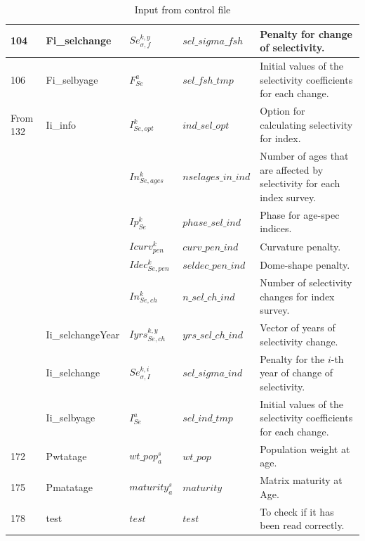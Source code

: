 \documentclass{article}
\begin{document}
\begin{table}[H]
\begin{tabular}{|| p{0.9cm} | p{4.0cm}  | p{1.9cm} | l | p{6cm} ||}
104 & Fi\_selchange &  $Se_{\sigma,f}^{k,y}$ & $sel\_sigma\_fsh$ & Penalty for change of selectivity.\\ \hline
106 & Fi\_selbyage & $F_{Se}^a$  & $sel\_fsh\_tmp$ &  Initial values of the selectivity coefficients for each change.\\ \hline
From 132 & Ii\_info   & $I_{Se,opt}^k$  & $ind\_sel\_opt$ & Option for calculating selectivity for index.\\ %
    &               & $In_{Se,ages}^k$  & $nselages\_in\_ind$ & Number of ages that are affected by selectivity for each index survey.\\ %
    &               &  $Ip_{Se}^k$ & $phase\_sel\_ind$ &Phase for age-spec indices. \\ %
    &               & $Icurv_{pen}^k$  & $curv\_pen\_ind$ & Curvature penalty.\\ %
    &               & $Idec_{Se,pen}^k$  & $seldec\_pen\_ind$ & Dome-shape penalty. \\ %
    &               & $In_{Se,ch}^k$                 &  $n\_sel\_ch\_ind$ & Number of selectivity changes for index survey.\\ %
    &   Ii\_selchangeYear & $Iyrs_{Se,ch}^{k,y}$                  &  $yrs\_sel\_ch\_ind$  & Vector of years of selectivity change. \\ %
    &   Ii\_selchange   & $Se_{\sigma,I}^{k,i}$                  &  $sel\_sigma\_ind$    & Penalty for the $i$-th year of change of selectivity.\\ \hline

    &  Ii\_selbyage             & $I_{Se}^a$  & $sel\_ind\_tmp$ & Initial values of the selectivity coefficients for each change.\\ \hline
172 &  Pwtatage & $wt\_pop^s_a$  & $wt\_pop$ & Population weight at age.\\ \hline
175 & Pmatatage  & $maturity^s_a$  & $maturity$  & Matrix maturity at Age.\\ \hline
178 & test & $test$  & $test$ & To check if it has been read correctly. \\ \hline

\end{tabular} 

    \caption{Input from control file}
    \label{tab:my_label3}
\end{table}
\end{document}
